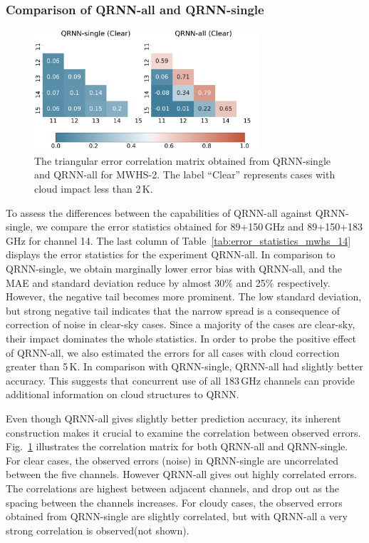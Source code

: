 \documentclass[amt, manuscript]{copernicus}
\begin{document}
\subsubsection{Comparison of QRNN-all and QRNN-single}
%
\begin{figure}[t]
	\centering
	\includegraphics[height=45mm]{Figures/correlation.pdf} 
	\caption{ The triangular error correlation matrix obtained from QRNN-single and QRNN-all for MWHS-2. The label ``Clear'' represents cases with cloud impact less than 2\,K.}
	\label{fig:correlations_mwhs}	
\end{figure}
To assess the differences between the capabilities of QRNN-all against QRNN-single, we  compare the error statistics obtained for 89+150\,GHz and 89+150+183\,GHz for channel 14. The last column of Table~\ref{tab:error_statistics_mwhs_14} displays the error statistics for the experiment QRNN-all. In comparison to QRNN-single, we obtain marginally lower error bias with QRNN-all, and the MAE and standard deviation reduce by almost 30\% and 25\% respectively. However, the negative tail becomes more prominent. The low standard deviation, but strong negative tail indicates that the narrow spread is a consequence of correction of noise in clear-sky cases. Since a majority of the cases are clear-sky, their impact dominates the whole statistics. In order to probe the positive effect of QRNN-all, we also estimated the errors for all cases with cloud correction greater than 5\,K. In comparison with QRNN-single, QRNN-all had slightly better accuracy. This suggests that concurrent use of all 183\,GHz channels can provide additional information on cloud structures to QRNN. 

Even though QRNN-all gives slightly better prediction accuracy, its inherent construction makes it crucial to examine the correlation between observed errors. Fig.~\ref{fig:correlations_mwhs} illustrates the correlation matrix for both QRNN-all and QRNN-single. For clear cases, the observed errors (noise) in QRNN-single are uncorrelated between the five channels. However QRNN-all gives out highly correlated errors. The correlations are highest between adjacent channels, and drop out as the spacing between the channels increases. For cloudy cases, the observed errors obtained from QRNN-single are slightly correlated, but with QRNN-all a very strong correlation is observed(not shown). 
\end{document}
